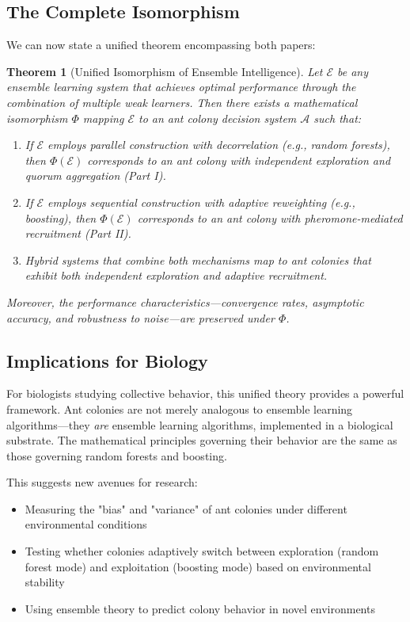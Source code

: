 \documentclass[12pt,letterpaper]{article}
\newtheorem{theorem}{Theorem}[section]
\begin{document}
\subsection{The Complete Isomorphism}

We can now state a unified theorem encompassing both papers:

\begin{theorem}[Unified Isomorphism of Ensemble Intelligence]
Let $\mathcal{E}$ be any ensemble learning system that achieves optimal performance through the combination of multiple weak learners. Then there exists a mathematical isomorphism $\Phi$ mapping $\mathcal{E}$ to an ant colony decision system $\mathcal{A}$ such that:

\begin{enumerate}
    \item If $\mathcal{E}$ employs parallel construction with decorrelation (e.g., random forests), then $\Phi(\mathcal{E})$ corresponds to an ant colony with independent exploration and quorum aggregation (Part I).
    \item If $\mathcal{E}$ employs sequential construction with adaptive reweighting (e.g., boosting), then $\Phi(\mathcal{E})$ corresponds to an ant colony with pheromone-mediated recruitment (Part II).
    \item Hybrid systems that combine both mechanisms map to ant colonies that exhibit both independent exploration and adaptive recruitment.
\end{enumerate}

Moreover, the performance characteristics—convergence rates, asymptotic accuracy, and robustness to noise—are preserved under $\Phi$.
\end{theorem}

\subsection{Implications for Biology}

For biologists studying collective behavior, this unified theory provides a powerful framework. Ant colonies are not merely analogous to ensemble learning algorithms—they \textit{are} ensemble learning algorithms, implemented in a biological substrate. The mathematical principles governing their behavior are the same as those governing random forests and boosting.

This suggests new avenues for research:
\begin{itemize}
    \item Measuring the "bias" and "variance" of ant colonies under different environmental conditions
    \item Testing whether colonies adaptively switch between exploration (random forest mode) and exploitation (boosting mode) based on environmental stability
    \item Using ensemble theory to predict colony behavior in novel environments
\end{itemize}
\end{document}
